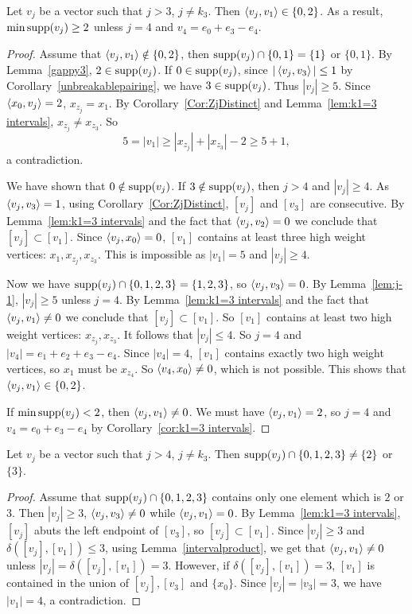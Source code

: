 \begin{lemma}\label{lem:v1Orth}
Let $v_j$ be a vector such that $j>3$, $j\neq k_3$. Then $\left\langle v_j , v_1 \right\rangle\in\{0,2\}$. As a result, $\min\operatorname{supp}(v_j)\ge2$ unless $j=4$ and $v_4 = e_0 + e_3-e_4$.
\end{lemma}
\begin{proof}
Assume that $\left\langle v_j , v_1 \right\rangle\notin\{0,2\}$, then $\operatorname{supp}(v_j)\cap\{0,1\}=\{1\}$ or $\{0,1\}$. By Lemma~\ref{gappy3}, $2\in \operatorname{supp}(v_j)$. 
If $0\in\operatorname{supp}(v_j)$, since $|\left\langle v_j , v_3 \right\rangle|\le1$ by Corollary~\ref{unbreakablepairing}, we have $3\in\operatorname{supp}(v_j)$. Thus $|v_j|\ge5$. Since $\left\langle x_0 , v_j \right\rangle=2$,  $x_{z_j}=x_1$. By Corollary~\ref{Cor:ZjDistinct} and Lemma~\ref{lem:k1=3 intervals}, $x_{z_j}\ne x_{z_3}$. So \[5=|v_1|\ge|x_{z_j}|+|x_{z_3}|-2\ge5+1,\]
a contradiction.

We have shown that $0\notin\operatorname{supp}(v_j)$. If $3\notin\operatorname{supp}(v_j)$, then $j>4$ and $|v_j|\ge4$. As $\left\langle v_j , v_3 \right\rangle=1$, using Corollary~\ref{Cor:ZjDistinct}, $[v_j]$ and $[v_3]$ are consecutive. By Lemma~\ref{lem:k1=3 intervals} and the fact that  $\left\langle v_j , v_2 \right\rangle=0$ we conclude that $[v_j]\subset[v_1]$. Since $\left\langle v_j , x_0 \right\rangle=0$, $[v_1]$ contains at least three high weight vertices: $x_1, x_{z_j}, x_{z_3}$. This is impossible as $|v_1|=5$ and $|v_j|\ge4$.

Now we have $\operatorname{supp}(v_j)\cap\{0,1,2,3\}=\{1,2,3\}$, so $\left\langle v_j , v_3 \right\rangle=0$. By  Lemma~\ref{lem:j-1}, $|v_j|\ge5$ unless $j=4$. By Lemma~\ref{lem:k1=3 intervals} and the fact that  $\left\langle v_j , v_1 \right\rangle\ne0$ we conclude that $[v_j]\subset[v_1]$. So $[v_1]$ contains at least two high weight vertices: $x_{z_j}, x_{z_3}$. It follows that $|v_j|\le4$. So $j=4$ and $|v_4| = e_1+e_2 + e_3-e_4$. Since $|v_4|=4$, $[v_1]$ contains exactly two high weight vertices, so $x_1$ must be $x_{z_4}$. So $\left\langle v_4 , x_0 \right\rangle\ne0$, which is not possible. This shows that $\left\langle v_j , v_1 \right\rangle\in\{0,2\}$.

If $\min\operatorname{supp}(v_j)<2$, then $\left\langle v_j , v_1 \right\rangle\ne0$. We must have $\left\langle v_j , v_1 \right\rangle=2$, so $j=4$ and $v_4 = e_0 + e_3-e_4$ by Corollary~\ref{cor:k1=3 intervals}.
\end{proof}

\begin{lemma}\label{lem:NoSingle}
Let $v_j$ be a vector such that $j>4$, $j\neq k_3$. Then $\operatorname{supp}(v_j)\cap\{0,1,2,3\}\ne\{2\}$ or $\{3\}$.
\end{lemma}
\begin{proof}
Assume that $\operatorname{supp}(v_j)\cap\{0,1,2,3\}$ contains only one element which is $2$ or $3$.
Then $|v_j|\ge3$, $\left\langle v_{j} , v_3 \right\rangle\ne0$ while $\left\langle v_{j} , v_1 \right\rangle=0$. By Lemma~\ref{lem:k1=3 intervals}, $[v_{j}]$ abuts the left endpoint of $[v_3]$, so $[v_j]\subset[v_1]$. Since $|v_j|\ge3$ and $\delta([v_j],[v_1])\le3$, using Lemma~\ref{intervalproduct}, we get that $\left\langle v_{j} , v_1 \right\rangle\ne 0$ unless $|v_j|=\delta([v_j],[v_1])=3$. However, if $\delta([v_j],[v_1])=3$, $[v_1]$ is contained in the union of $[v_j],[v_3]$ and $\{x_0\}$. Since $|v_j|=|v_3|=3$, we have $|v_1|=4$, a contradiction.
\end{proof}

